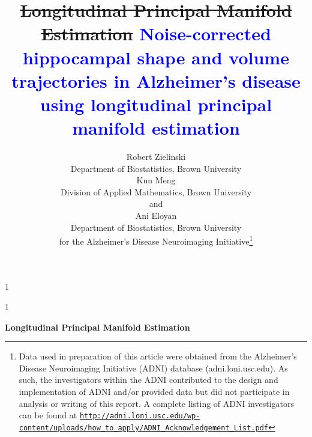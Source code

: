 \documentclass[12pt]{article}
\newcommand{\blind}{1}
\theoremstyle{definition}
\begin{document}
\def\spacingset#1{\renewcommand{\baselinestretch}%
{#1}\small\normalsize} \spacingset{1}

\newcommand{\revision}[1]{\textcolor{blue}{#1}}
\newcommand{\outdated}[1]{\sout{#1}}



\blind
{
  \title{\bf \outdated{Longitudinal Principal Manifold Estimation} \revision{Noise-corrected hippocampal shape and volume trajectories in Alzheimer's disease using longitudinal principal manifold estimation}}
  \author{
    Robert Zielinski\hspace{.2cm}\\
    Department of Biostatistics, Brown University\\
    Kun Meng \\
    Division of Applied Mathematics, Brown University\\
    and \\
    Ani Eloyan \\
    Department of Biostatistics, Brown University\\
    for the Alzheimer's Disease Neuroimaging Initiative\thanks{Data used in preparation of this article were obtained from the Alzheimer's Disease Neuroimaging Initiative (ADNI) database (adni.loni.usc.edu). As such, the investigators within the ADNI contributed to the design and implementation of ADNI and/or provided data but did not participate in analysis or writing of this report. A complete listing of ADNI investigators can be found at \href{http://adni.loni.usc.edu/wp-content/uploads/how_to_apply/ADNI_Acknowledgement_List.pdf}{\texttt{http://adni.loni.usc.edu/wp-content/uploads/how\_to\_apply/ADNI\_Acknowledgement\_List.pdf}}}}
  \maketitle
} \fi

\blind
{
  \bigskip
  \bigskip
  \bigskip
  \begin{center}
    {\LARGE\bf Longitudinal Principal Manifold Estimation}
\end{center}
  \medskip
} \fi
\end{document}
